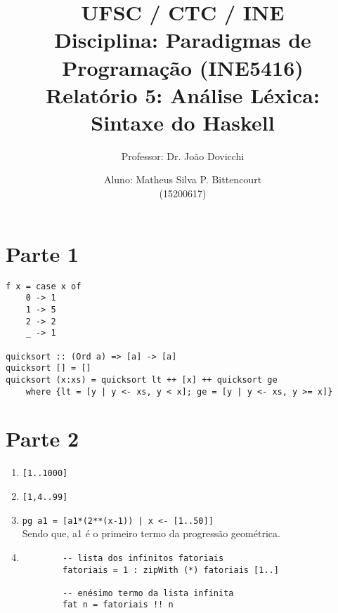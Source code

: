\documentclass[letterpaper,twocolumn,10pt]{article}
\begin{document}
\title{
	\large \rm UFSC / CTC / INE\\
	\large \rm Disciplina: Paradigmas de Programação (INE5416)\\
	\Large \bf Relatório 5: Análise Léxica: Sintaxe do Haskell
}

\author{
	Professor: Dr. João Dovicchi\\
	\and
	Aluno: Matheus Silva P. Bittencourt\\(15200617)
}

\maketitle

\thispagestyle{empty} %

\section*{Parte 1}

\begin{verbatim}
f x = case x of
    0 -> 1
    1 -> 5
    2 -> 2
    _ -> 1

quicksort :: (Ord a) => [a] -> [a]
quicksort [] = []
quicksort (x:xs) = quicksort lt ++ [x] ++ quicksort ge
    where {lt = [y | y <- xs, y < x]; ge = [y | y <- xs, y >= x]}
\end{verbatim}

\section*{Parte 2}

\begin{enumerate}
	\item \verb$[1..1000]$
	\item \verb$[1,4..99]$
	\item \verb$pg a1 = [a1*(2**(x-1)) | x <- [1..50]]$\\
		Sendo que, a1 é o primeiro termo da progressão geométrica.
	\item
		\begin{verbatim}
		-- lista dos infinitos fatoriais
		fatoriais = 1 : zipWith (*) fatoriais [1..]

		-- enésimo termo da lista infinita
		fat n = fatoriais !! n
		\end{verbatim}
\end{enumerate}
\end{document}
